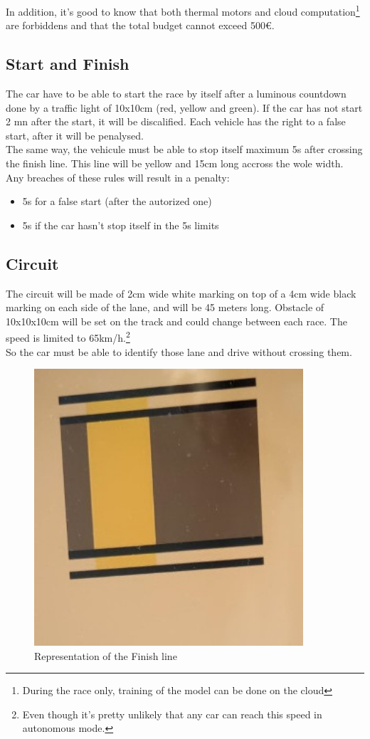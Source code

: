 In addition, it's good to know that both thermal motors and cloud computation\footnote{During the race only, training of the model can be done on the cloud} are forbiddens and that the total budget cannot exceed 500\euro{}.

\subsection{Start and Finish}
The car have to be able to start the race by itself after a luminous countdown done by a traffic light of 10x10cm (red, yellow and green). If the car has not start 2 mn after the start, it will be discalified. Each vehicle has the right to a false start, after it will be penalysed. \\

The same way, the vehicule must be able to stop itself maximum 5s after crossing the finish line. This line will be yellow and 15cm long accross the wole width.\\

Any breaches of these rules will result in a penalty:
\begin{itemize}
\item 5s for a false start (after the autorized one)
\item 5s if the car hasn't stop itself in the 5s limits
\end{itemize}

\subsection{Circuit}
The circuit will be made of 2cm wide white marking on top of a 4cm wide black marking on each side of the lane, and will be 45 meters long. Obstacle of 10x10x10cm will be set on the track and could change between each race. The speed is limited to 65km/h.\footnote{Even though it's pretty unlikely that any car can reach this speed in autonomous mode.}\\
So the car must be able to identify those lane and drive without crossing them.\\

\begin{figure}[!h]
\centering
\includegraphics[angle=-90,width=10cm]{img/road.jpeg}
\caption{Representation of the Finish line}
\end{figure}
\clearpage

